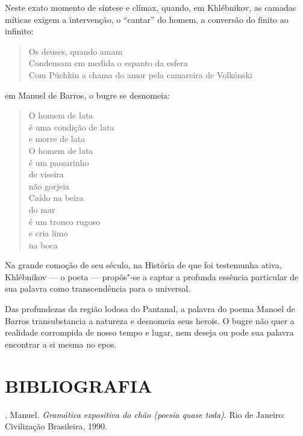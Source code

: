 Neste exato momento de síntese e clímax, quando, em Khlébnikov, as
camadas míticas exigem a intervenção, o ``cantar'' do homem, a conversão
do finito ao infinito:

\begin{verse}
Os deuses, quando amam \\
Condensam em medida o espanto da esfera \\
Com Púchkin a chama do amor pela \qb{}camareira de Volkónski
\end{verse}

em Manuel de Barros, o bugre se desnomeia:

\begin{verse}
O homem de lata \\
é uma condição de lata \\
e morre de lata \\[8pt]
O homem de lata \\
é um passarinho \\
de viseira \\
não gorjeia \\[8pt]
Caído na beira \\
do mar \\
é um tronco rugoso \\
e cria limo \\
na boca
\end{verse}

Na grande comoção de seu século, na História de que foi testemunha
ativa, Khlébnikov --- o poeta --- propôs"-se a captar a profunda essência
particular de sua palavra como transcendência para o universal.

Das profundezas da região lodosa do Pantanal, a palavra do poema Manoel
de Barros transubstancia a natureza e desnomeia seus herois. O bugre não
quer a realidade corrompida de nosso tempo e lugar, nem deseja ou pode
sua palavra encontrar a si mesma no epos.

\section{BIBLIOGRAFIA}

, Manuel. \emph{Gramática expositiva do chão (poesia quase toda)}.
Rio de Janeiro: Civilização Brasileira, 1990.

